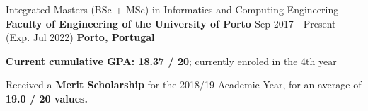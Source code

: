 

\begin{cventries}

  \cventry
    {Integrated Masters (BSc + MSc) in Informatics and Computing Engineering} %
    {\textbf{Faculty of Engineering of the University of Porto \href{https://sigarra.up.pt/feup/en/web_page.inicial}{\faExternalLink}}} %
    {Sep 2017 - Present (Exp. Jul 2022)} %
    {\textbf{Porto, Portugal}} %
    {
      \begin{cvitems} %
        \item {\textbf{Current cumulative GPA: 18.37 / 20}; currently enroled in the 4th year}
        \item {Received a \textbf{Merit Scholarship} for the 2018/19 Academic Year, for an average of \textbf{19.0 / 20 values.}}
      \end{cvitems}
    }

\end{cventries}
